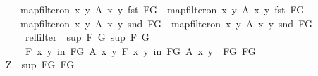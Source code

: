 \begin{isabellebody}
\ \ \ \ {\isacharparenleft}{\kern0pt}map{\isacharunderscore}{\kern0pt}filter{\isacharunderscore}{\kern0pt}on\ {\isacharbraceleft}{\kern0pt}{\isacharparenleft}{\kern0pt}x{\isacharcomma}{\kern0pt}\ y{\isacharparenright}{\kern0pt}{\isachardot}{\kern0pt}\ A\ x\ y{\isacharbraceright}{\kern0pt}\ fst\ FG\ {\isasymsqunion}\ map{\isacharunderscore}{\kern0pt}filter{\isacharunderscore}{\kern0pt}on\ {\isacharbraceleft}{\kern0pt}{\isacharparenleft}{\kern0pt}x{\isacharcomma}{\kern0pt}\ y{\isacharparenright}{\kern0pt}{\isachardot}{\kern0pt}\ A\ x\ y{\isacharbraceright}{\kern0pt}\ fst\ FG{\isacharprime}{\kern0pt}{\isacharparenright}{\kern0pt}\isanewline
\ \ \ \ {\isacharparenleft}{\kern0pt}map{\isacharunderscore}{\kern0pt}filter{\isacharunderscore}{\kern0pt}on\ {\isacharbraceleft}{\kern0pt}{\isacharparenleft}{\kern0pt}x{\isacharcomma}{\kern0pt}\ y{\isacharparenright}{\kern0pt}{\isachardot}{\kern0pt}\ A\ x\ y{\isacharbraceright}{\kern0pt}\ snd\ FG\ {\isasymsqunion}\ map{\isacharunderscore}{\kern0pt}filter{\isacharunderscore}{\kern0pt}on\ {\isacharbraceleft}{\kern0pt}{\isacharparenleft}{\kern0pt}x{\isacharcomma}{\kern0pt}\ y{\isacharparenright}{\kern0pt}{\isachardot}{\kern0pt}\ A\ x\ y{\isacharbraceright}{\kern0pt}\ snd\ FG{\isacharprime}{\kern0pt}{\isacharparenright}{\kern0pt}{\isachardoublequoteclose}\isanewline
\ \ \ \ {\isacharparenleft}{\kern0pt}\ {\isachardoublequoteopen}rel{\isacharunderscore}{\kern0pt}filter\ {\isacharunderscore}{\kern0pt}\ {\isacharparenleft}{\kern0pt}sup\ {\isacharquery}{\kern0pt}F\ {\isacharquery}{\kern0pt}G{\isacharparenright}{\kern0pt}\ {\isacharparenleft}{\kern0pt}sup\ {\isacharquery}{\kern0pt}F{\isacharprime}{\kern0pt}\ {\isacharquery}{\kern0pt}G{\isacharprime}{\kern0pt}{\isacharparenright}{\kern0pt}{\isachardoublequoteclose}{\isacharparenright}{\kern0pt}\isanewline
\ \ \ \ \ {\isachardoublequoteopen}{\isasymforall}\isactrlsub F\ {\isacharparenleft}{\kern0pt}x{\isacharcomma}{\kern0pt}\ y{\isacharparenright}{\kern0pt}\ in\ FG{\isachardot}{\kern0pt}\ A\ x\ y{\isachardoublequoteclose}\ {\isachardoublequoteopen}{\isasymforall}\isactrlsub F\ {\isacharparenleft}{\kern0pt}x{\isacharcomma}{\kern0pt}\ y{\isacharparenright}{\kern0pt}\ in\ FG{\isacharprime}{\kern0pt}{\isachardot}{\kern0pt}\ A\ x\ y{\isachardoublequoteclose}\ \ FG\ FG{\isacharprime}{\kern0pt}\isanewline
\ \ \isamarkupfalse%
\isanewline
\ \ \ \ \isamarkupfalse%
\ {\isacharquery}{\kern0pt}Z\ {\isacharequal}{\kern0pt}\ {\isachardoublequoteopen}sup\ FG\ FG{\isacharprime}{\kern0pt}{\isachardoublequoteclose}\isanewline

\end{isabellebody}
